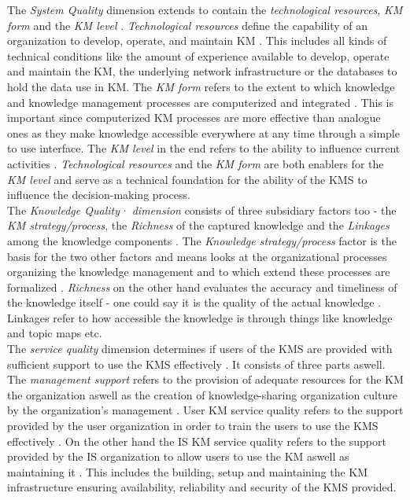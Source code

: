 \documentclass[
	english,
	ruledheaders=section,%
	class=report,%
	thesis={type=bachelor},%
	accentcolor=1b,%
	custommargins=true,%
	marginpar=false,%
	parskip=half-,%
	fontsize=11pt,%
	DIV=14,
]{tudapub}
\begin{document}
The \textit{System Quality} dimension extends to contain the \textit{technological resources}, \textit{KM form} and the \textit{KM level} \parencite[p.~56]{Jennex2006}. \textit{Technological resources} define the capability of an organization to develop, operate, and maintain KM \parencite[p.~56]{Jennex2006}. This includes all kinds of technical conditions like the amount of experience available to develop, operate and maintain the KM, the underlying network infrastructure or the databases to hold the data use in KM. The \textit{KM form} refers to the extent to which knowledge and knowledge management processes are computerized and integrated \parencite[p.~56]{Jennex2006}. This is important since computerized KM processes are more effective than analogue ones as they make knowledge accessible everywhere at any time through a simple to use interface. The \textit{KM level} in the end refers to the ability to influence current activities \parencite[p.~57]{Jennex2006}. \textit{Technological resources} and the \textit{KM form} are both enablers for the \textit{KM level} and serve as a technical foundation for the ability of the KMS to influence the decision-making process.\\
The \textit{Knowledge Quality· dimension} consists of three subsidiary factors too - the \textit{KM strategy/process}, the \textit{Richness} of the captured knowledge and the \textit{Linkages} among the knowledge components \parencite[p.~57]{Jennex2006}. The \textit{Knowledge strategy/process} factor is the basis for the two other factors and means looks at the organizational processes organizing the knowledge management and to which extend these processes are formalized \parencite[p.~57]{Jennex2006}. \textit{Richness} on the other hand evaluates the accuracy and timeliness of the knowledge itself - one could say it is the quality of the actual knowledge \parencite[p.~57]{Jennex2006}. Linkages refer to how accessible the knowledge is through things like knowledge and topic maps etc. \parencite[p.~57]{Jennex2006}\\
The \textit{service quality} dimension determines if users of the KMS are provided with sufficient support to use the KMS effectively \parencite[p.~58]{Jennex2006}. It consists of three parts aswell. The \textit{management support} refers to the provision of adequate resources for the KM the organization aswell as the creation of knowledge-sharing organization culture by the organization's management \parencite[p.~58]{Jennex2006}. User KM service quality refers to the support provided by the user organization in order to train the users to use the KMS effectively \parencite[p.~58]{Jennex2006}. On the other hand the IS KM service quality refers to the support provided by the IS organization to allow users to use the KM aswell as maintaining it \parencite[p.~59]{Jennex2006}. This includes the building, setup and maintaining the KM infrastructure ensuring availability, reliability and security of the KMS provided.\\\\
\end{document}
